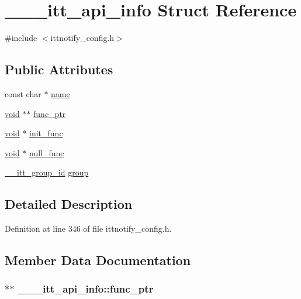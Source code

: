 \hypertarget{struct______itt__api__info}{\section{\-\_\-\-\_\-\-\_\-itt\-\_\-api\-\_\-info Struct Reference}
\label{struct______itt__api__info}
}


{\ttfamily \#include $<$ittnotify\-\_\-config.\-h$>$}

\subsection*{Public Attributes}
\begin{DoxyCompactItemize}
\item 
const char $\ast$ \hyperlink{struct______itt__api__info_abb7f1e06b74fb586eb8d1e7570cd6263}{name}
\item 
\hyperlink{ittnotify__static_8h_af941d56e55e3c5465135b60c4d6343ed}{void} $\ast$$\ast$ \hyperlink{struct______itt__api__info_a3f5d0605499d1a9911080be2fabfc18b}{func\-\_\-ptr}
\item 
\hyperlink{ittnotify__static_8h_af941d56e55e3c5465135b60c4d6343ed}{void} $\ast$ \hyperlink{struct______itt__api__info_a21210573f2cde6f6b8c781da860dad7b}{init\-\_\-func}
\item 
\hyperlink{ittnotify__static_8h_af941d56e55e3c5465135b60c4d6343ed}{void} $\ast$ \hyperlink{struct______itt__api__info_ab182f072fe2a2f4740be6b1d0499348f}{null\-\_\-func}
\item 
\hyperlink{ittnotify__types_8h_ab43d42e38047ed421321091868ff992b}{\-\_\-\-\_\-itt\-\_\-group\-\_\-id} \hyperlink{struct______itt__api__info_a42bda2bfa667003e920bbf6995f5d375}{group}
\end{DoxyCompactItemize}


\subsection{Detailed Description}


Definition at line 346 of file ittnotify\-\_\-config.\-h.



\subsection{Member Data Documentation}
\hypertarget{struct______itt__api__info_a3f5d0605499d1a9911080be2fabfc18b}{
\subsubsection[{func\-\_\-ptr}]{$\ast$$\ast$ \-\_\-\-\_\-\-\_\-itt\-\_\-api\-\_\-info\-::func\-\_\-ptr}}\label{struct______itt__api__info_a3f5d0605499d1a9911080be2fabfc18b}


